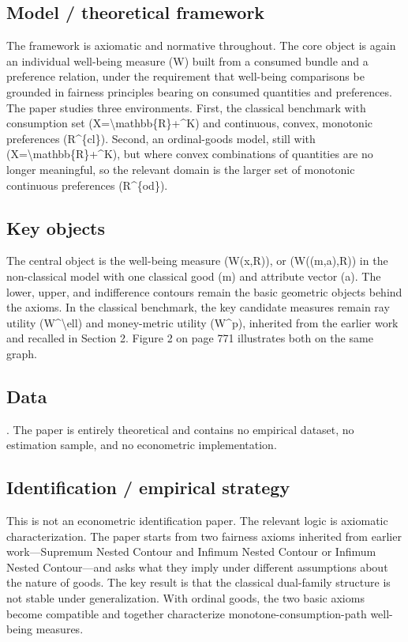 \documentclass[11pt,a4paper]{article}
\begin{document}
\subsection*{Model / theoretical framework}
The framework is axiomatic and normative throughout. The core object is again an individual well-being measure (W) built from a consumed bundle and a preference relation, under the requirement that well-being comparisons be grounded in fairness principles bearing on consumed quantities and preferences. The paper studies three environments. First, the classical benchmark with consumption set (X=\textbackslash{}mathbb\{R\}+\textasciicircum{}K) and continuous, convex, monotonic preferences (R\textasciicircum{}\{cl\}). Second, an ordinal-goods model, still with (X=\textbackslash{}mathbb\{R\}+\textasciicircum{}K), but where convex combinations of quantities are no longer meaningful, so the relevant domain is the larger set of monotonic continuous preferences (R\textasciicircum{}\{od\}).

\subsection*{Key objects}
The central object is the well-being measure (W(x,R)), or (W((m,a),R)) in the non-classical model with one classical good (m) and attribute vector (a). The lower, upper, and indifference contours remain the basic geometric objects behind the axioms. In the classical benchmark, the key candidate measures remain ray utility (W\textasciicircum{}\textbackslash{}ell) and money-metric utility (W\textasciicircum{}p), inherited from the earlier work and recalled in Section 2. Figure 2 on page 771 illustrates both on the same graph.

\subsection*{Data}
. The paper is entirely theoretical and contains no empirical dataset, no estimation sample, and no econometric implementation.

\subsection*{Identification / empirical strategy}
This is not an econometric identification paper. The relevant logic is axiomatic characterization. The paper starts from two fairness axioms inherited from earlier work—Supremum Nested Contour and Infimum Nested Contour or Infimum Nested Contour—and asks what they imply under different assumptions about the nature of goods. The key result is that the classical dual-family structure is not stable under generalization. With ordinal goods, the two basic axioms become compatible and together characterize monotone-consumption-path well-being measures.
\end{document}
